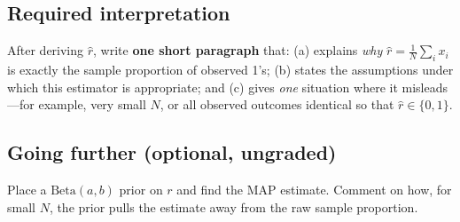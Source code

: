 \documentclass[11pt]{article}
\begin{document}
\subsection*{Required interpretation}

\noindent After deriving $\hat{r}$, write \textbf{one short paragraph} that:
(a) explains \emph{why} $\hat{r} = \frac{1}{N}\sum_{i} x_i$ is exactly the
sample proportion of observed 1's; (b) states the assumptions under which this
estimator is appropriate; and (c) gives \emph{one} situation where it
misleads---for example, very small $N$, or all observed outcomes identical so
that $\hat{r}\in\{0,1\}$.

\subsection*{Going further (optional, ungraded)}

\noindent Place a $\mathrm{Beta}(a,b)$ prior on $r$ and find the MAP estimate.
Comment on how, for small $N$, the prior pulls the estimate away from the raw
sample proportion.
\end{document}
